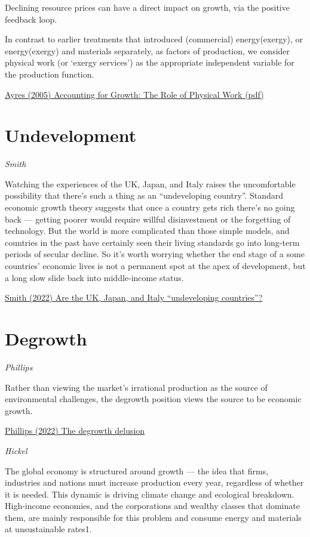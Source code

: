 \documentclass[
]{book}
\begin{document}
Declining resource prices can have a direct impact on growth,
via the positive feedback loop.

In contrast to earlier treatments that
introduced (commercial) energy(exergy), or energy(exergy) and materials separately, as factors
of production, we consider physical work (or `exergy services') as the appropriate independent
variable for the production function.

\href{pdf/Ayres_2005_Accounting_for_Growth_Physical_Work.pdf}{Ayres (2005) Accounting for Growth: The Role of Physical Work (pdf)}

\hypertarget{undevelopment}{%
\section{Undevelopment}\label{undevelopment}}

\emph{Smith}

Watching the experiences of the UK, Japan, and Italy raises the uncomfortable possibility that there's such a thing as an ``undeveloping country''. Standard economic growth theory suggests that once a country gets rich there's no going back --- getting poorer would require willful disinvestment or the forgetting of technology. But the world is more complicated than those simple models, and countries in the past have certainly seen their living standards go into long-term periods of secular decline. So it's worth worrying whether the end stage of a some countries' economic lives is not a permanent spot at the apex of development, but a long slow slide back into middle-income status.

\href{https://noahpinion.substack.com/p/are-the-uk-japan-and-italy-undeveloping}{Smith (2022) Are the UK, Japan, and Italy ``undeveloping countries''?}

\hypertarget{degrowth}{%
\section{Degrowth}\label{degrowth}}

\emph{Phillips}

Rather than viewing the market's irrational production as the source of environmental challenges, the degrowth position views the source to be economic growth.

\href{https://www.opendemocracy.net/en/oureconomy/degrowth-delusion/}{Phillips (2022) The degrowth delusion}

\emph{Hickel}

The global economy is structured around growth --- the idea that firms, industries and nations must increase production every year, regardless of whether it is needed. This dynamic is driving climate change and ecological breakdown. High-income economies, and the corporations and wealthy classes that dominate them, are mainly responsible for this problem and consume energy and materials at unsustainable rates1.
\end{document}

